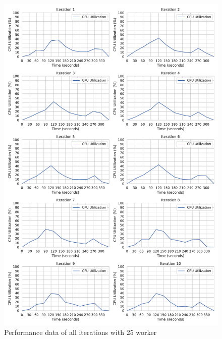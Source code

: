 \begin{figure}[h]
\centering
\includegraphics[scale=0.4]{images/07_evaluation/regression/25_worker_cpu_performance}
\caption{Performance data of all iterations with 25 worker}
\label{fig:appendix_eval_regression_static25}
\end{figure}

